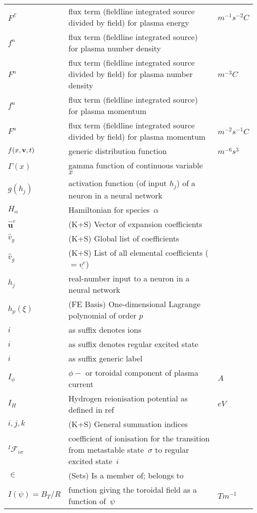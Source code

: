 \begin{longtable}{|p{3.0cm}|p{10.0cm}|p{3.0cm}|}
$F^\mathcal{E}$ & flux term (fieldline integrated source divided by field) for plasma energy  &  $m^{-1} s^{-2} C$ \\
$f^n$ & flux term (fieldline integrated source) for plasma number density & \\
$F^n$ & flux term (fieldline integrated source divided by field) for plasma number density  &  $m^{-3} C$ \\
$f^u$ & flux term (fieldline integrated source) for plasma momentum  & \\
$F^u$ & flux term (fieldline integrated source divided by field) for plasma momentum  &  $m^{-2} s^{-1} C$ \\
$f(x,{\bf v},t)$ & generic distribution function & $m^{-6} s^3$ \\
$\Gamma(x)$ & gamma function of continuous variable $x$  & \\
$g(h_j)$ & activation function (of input $h_j$) of a neuron in a neural network  & \\
$H_\alpha$ & Hamiltonian for species~$\alpha$ & \\
$\hat{\boldsymbol{u}}^e$ &  (K+S) Vector of expansion coefficients & \\
$\hat{v}_g$ &  (K+S) Global list of coefficients & \\
$\hat{v}_g$ &  (K+S) List of all elemental coefficients ($=\underline{v^e}$) & \\
$h_j$ & real-number input to a neuron in a neural network  & \\
$h_p(\xi)$ &  (FE Basis) One-dimensional Lagrange polynomial of order $p$ & \\
$i$ & as suffix denotes ions & \\
$i$ & as suffix denotes regular excited state & \\
$i$ & as suffix generic label & \\
$I_\phi$ & $\phi-$ or toroidal component of plasma current & $A$ \\
$I_H$ & Hydrogen reionisation potential as defined in ref~\cite{Ha13Benc} & $eV$ \\
$i,j,k$ &  (K+S) General summation indices & \\
$^I\mathcal{F}_{i\sigma}$ & coefficient of ionisation for the transition from metastable state~$\sigma$ to regular excited state~$i$ & \\
$\in$ &  (Sets) Is a member of; belongs to & \\
$I(\psi)=B_T/R$ & function giving the toroidal field as a function of~$\psi$  & $T m^{-1}$ \\

\end{longtable}

